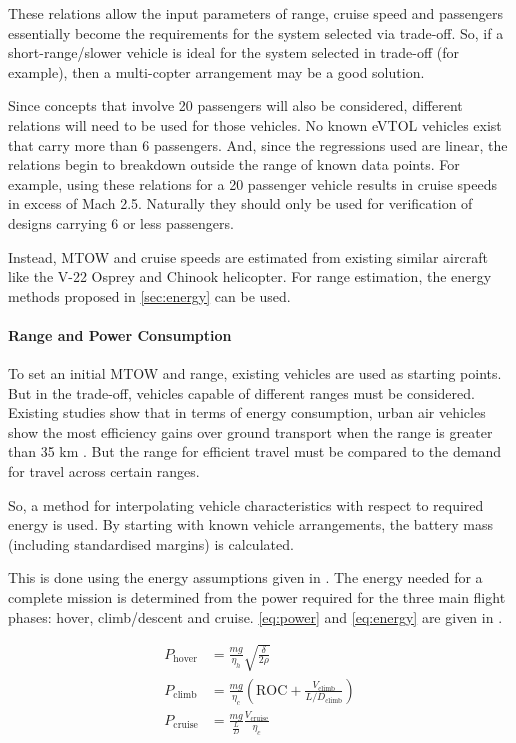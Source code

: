 These relations allow the input parameters of range, cruise speed and passengers essentially become the requirements for the system selected via trade-off. So, if a short-range/slower vehicle is ideal for the system selected in trade-off (for example), then a multi-copter arrangement may be a good solution.

Since concepts that involve 20 passengers will also be considered, different relations will need to be used for those vehicles. No known eVTOL vehicles exist that carry more than 6 passengers. And, since the regressions used are linear, the relations begin to breakdown outside the range of known data points. For example, using these relations for a 20 passenger vehicle results in cruise speeds in excess of Mach 2.5. Naturally they should only be used for verification of designs carrying 6 or less passengers.

Instead, MTOW and cruise speeds are estimated from existing similar aircraft like the V-22 Osprey and Chinook helicopter. For range estimation, the energy methods proposed in \autoref{sec:energy} can be used.

\paragraph{Range and Power Consumption}\label{sec:energy}

To set an initial MTOW and range, existing vehicles are used as starting points. But in the trade-off, vehicles capable of different ranges must be considered. Existing studies show that in terms of energy consumption, urban air vehicles show the most efficiency gains over ground transport when the range is greater than 35 km \cite{ford}\cite{uberwhitepaper}. But the range for efficient travel must be compared to the demand for travel across certain ranges.

So, a method for interpolating vehicle characteristics with respect to required energy is used. By starting with known vehicle arrangements, the battery mass (including standardised margins) is calculated.

This is done using the energy assumptions given in \cite{ford}. The energy needed for a complete mission is determined from the power required for the three main flight phases: hover, climb/descent and cruise. \autoref{eq:power} and \autoref{eq:energy} are given in \cite{ford}. 

\begin{equation}
    \label{eq:power}
    \begin{split}
    P_\text{hover} &= \frac{mg}{\eta_h}\sqrt{\frac{\delta}{2\rho}}\\
    P_\text{climb} &= \frac{mg}{\eta_c}\left( \text{ROC} + \frac{V_\text{climb}}{L/D_\text{climb}} \right)\\
    P_\text{cruise} &= \frac{mg}{\frac{L}{D}}\frac{V_\text{cruise}}{\eta_c}
    \end{split}
\end{equation}

